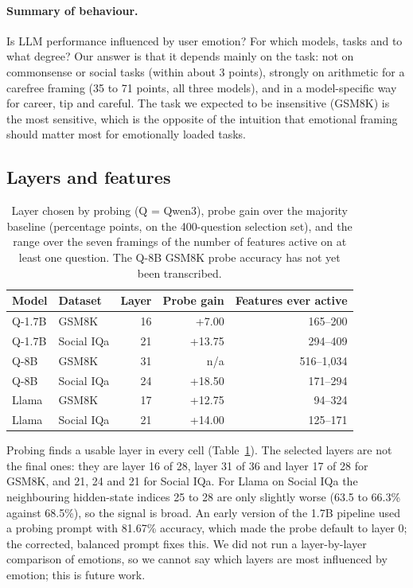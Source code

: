 \documentclass[11pt]{article}
\begin{document}
\paragraph{Summary of behaviour.} Is LLM performance influenced by user emotion? For which models, tasks and to what degree? Our answer is that it depends mainly on the task: not on commonsense or social tasks (within about 3 points), strongly on arithmetic for a carefree framing (35 to 71 points, all three models), and in a model-specific way for career, tip and careful. The task we expected to be insensitive (GSM8K) is the most sensitive, which is the opposite of the intuition that emotional framing should matter most for emotionally loaded tasks.

\subsection{Layers and features}

\begin{table}[t]
\centering\footnotesize
\setlength{\tabcolsep}{3pt}
\begin{tabular}{llrrr}
\toprule
Model & Dataset & Layer & Probe gain & Features ever active \\
\midrule
Q-1.7B & GSM8K & 16 & +7.00 & 165--200 \\
Q-1.7B & Social IQa & 21 & +13.75 & 294--409 \\
Q-8B & GSM8K & 31 & n/a & 516--1,034 \\
Q-8B & Social IQa & 24 & +18.50 & 171--294 \\
Llama & GSM8K & 17 & +12.75 & 94--324 \\
Llama & Social IQa & 21 & +14.00 & 125--171 \\
\bottomrule
\end{tabular}
\caption{Layer chosen by probing (Q = Qwen3), probe gain over the majority baseline (percentage points, on the 400-question selection set), and the range over the seven framings of the number of features active on at least one question. The Q-8B GSM8K probe accuracy has not yet been transcribed.}
\label{tab:probe}
\end{table}

Probing finds a usable layer in every cell (Table~\ref{tab:probe}). The selected layers are not the final ones: they are layer 16 of 28, layer 31 of 36 and layer 17 of 28 for GSM8K, and 21, 24 and 21 for Social IQa. For Llama on Social IQa the neighbouring hidden-state indices 25 to 28 are only slightly worse (63.5 to 66.3\% against 68.5\%), so the signal is broad. An early version of the 1.7B pipeline used a probing prompt with 81.67\% accuracy, which made the probe default to layer 0; the corrected, balanced prompt fixes this. We did not run a layer-by-layer comparison of emotions, so we cannot say which layers are most influenced by emotion; this is future work.
\end{document}
